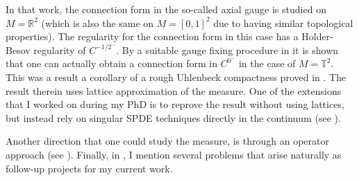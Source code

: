 \documentclass[11pt]{article}
\numberwithin{equation}{section}
\theoremstyle{definition}
\theoremstyle{remark}
\newcommand{\diff}{\mathrm{d}}
\newcommand{\R}{\mathbb R}
\newcommand{\1}{\mathbf 1}
\newcommand{\<}{\langle}
\renewcommand{\>}{\rangle}
\newcommand{\bT}{\mathbb T}
\begin{document}
%
%
%
%
%
%
In that work, the connection form in the so-called axial gauge is studied on $M=\R^2$ (which is also the same on $M=[0,1]^2$ due to having similar topological properties).
The regularity for the connection form in this case has a Holder-Besov regularity of $C^{-1/2^-}$. By a suitable gauge fixing procedure in \cite{Chevyrev19} it is shown that one can actually obtain a connection form in $C^{0^-}$ in the case of $M=\bT^2$. This was a result a corollary of a rough Uhlenbeck compactness proved in \cite{Chevyrev19}. The result therein uses lattice approximation of the measure. One of the extensions that I worked on during my PhD is to reprove the result without using lattices, but instead rely on singular SPDE techniques directly in the continuum (see  ). 
%

Another direction that one could study the measure, is through an operator approach (see ). 
%
%
Finally, in , I mention several problems that arise naturally as follow-up projects for my current work.  
\end{document}
